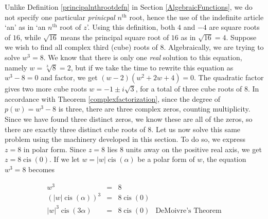 Unlike Definition \ref{principalnthrootdefn} in Section \ref{AlgebraicFunctions}, we do not specify one particular \textit{prinicpal} $n^{\text{th}}$ root, hence the use of the indefinite article `an' as in `an $n^{\text{th}}$ root of $z$'.  Using this definition, both $4$ and $-4$ are square roots of $16$, while $\sqrt{16}$ means the principal square root of $16$ as in $\sqrt{16}= 4$.  Suppose we wish to find all complex third (cube) roots of $8$.  Algebraically, we are trying to solve $w^{3} = 8$.  We know that there is only one \textit{real} solution to this equation, namely $w = \sqrt[3]{8} = 2$, but if we take the time to rewrite this equation as $w^3 - 8 = 0$ and factor, we get $(w-2)\left(w^2 + 2w + 4\right) = 0$.  The quadratic factor gives two more cube roots $w = -1 \pm i \sqrt{3}$, for a total of three cube roots of $8$. In accordance with Theorem \ref{complexfactorization}, since the degree of $p(w) = w^3 -8$ is three, there are three complex zeros, counting multiplicity.  Since we have found three distinct zeros, we know these are all of the zeros, so there are exactly three distinct cube roots of $8$.  Let us now solve this same problem using the machinery developed in this section.  To do so, we express $z = 8$ in polar form. Since $z=8$ lies $8$ units away on the positive real axis, we get $z = 8 \operatorname{cis}(0)$.  If we let $w = |w| \operatorname{cis}(\alpha)$ be a polar form of $w$, the equation $w^3 = 8$ becomes

\[ \begin{array}{rcll}

w^3 & = & 8 & \\[3pt]
\left(|w| \operatorname{cis}(\alpha)\right)^3 & = & 8 \operatorname{cis}(0) & \\[3pt]
|w|^3 \operatorname{cis}(3\alpha) & = & 8 \operatorname{cis}(0) & \text{DeMoivre's Theorem} \\[3pt]

\end{array}\]

